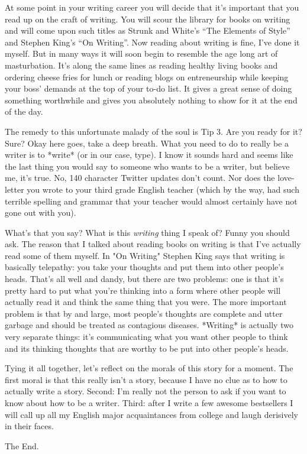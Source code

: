 \documentclass[11pt,letterpaper]{article}
\begin{document}
At some point in your writing career you will decide that it's important that you read up on the craft of writing. You will scour the library for books on writing and will come upon such titles as Strunk and White's ``The Elements of Style'' and Stephen King's ``On Writing''. Now reading about writing is fine, I've done it myself. But in many ways it will soon begin to resemble the age long art of masturbation. It's along the same lines as reading healthy living books and ordering cheese fries for lunch or reading blogs on entreneurship while keeping your boss' demands at the top of your to-do list. It gives a great sense of doing something worthwhile and gives you absolutely nothing to show for it at the end of the day. 

The remedy to this unfortunate malady of the soul is Tip 3. Are you ready for it? Sure? Okay here goes, take a deep breath. What you need to do to really be a writer is to *write* (or in our case, type). I know it sounds hard and seems like the last thing you would say to someone who wants to be a writer, but believe me, it's true. No, 140 character Twitter updates don't count. Nor does the love-letter you wrote to your third grade English teacher (which by the way, had such terrible spelling and grammar that your teacher would almost certainly have not gone out with you).

What's that you say? What is this \textit{writing} thing I speak of? Funny you should ask. The reason that I talked about reading books on writing is that I've actually read some of them myself. In "On Writing" Stephen King says that writing is basically telepathy: you take your thoughts and put them into other people's heads. That's all well and dandy, but there are two problems: one is that it's pretty hard to put what you're thinking into a form where other people will actually read it and think the same thing that you were. The more important problem is that by and large, most people's thoughts are complete and utter garbage and should be treated as contagious diseases. *Writing* is actually two very separate things: it's communicating what you want other people to think and its thinking thoughts that are worthy to be put into other people's heads.

Tying it all together, let's reflect on the morals of this story for a moment. The first moral is that this really isn't a story, because I have no clue as to how to actually write a story. Second: I'm really not the person to ask if you want to know about how to be a writer. Third: after I write a few awesome bestsellers I will call up all my English major acquaintances from college and laugh derisively in their faces.

The End.
\end{document}
